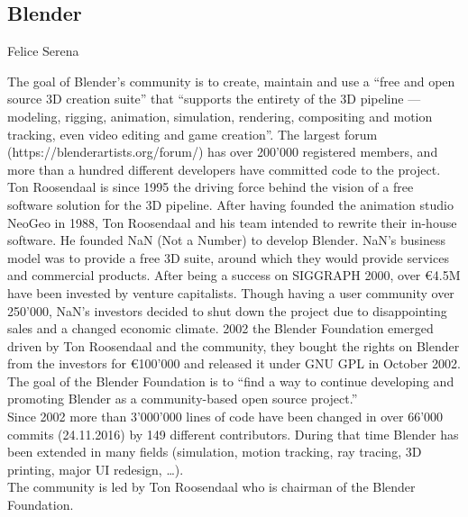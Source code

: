 \subsection{Blender}{Felice Serena}

The goal of Blender's community is to create, maintain and use a ``free and open source 3D creation suite'' that ``supports the entirety of the 3D pipeline — modeling, rigging, animation, simulation, rendering, compositing and motion tracking, even video editing and game creation''. 
The largest forum (https://blenderartists.org/forum/) has over 200'000 registered members, and more than a hundred different developers have committed code to the project. 
Ton Roosendaal is since 1995 the driving force behind the vision of a free software solution for the 3D pipeline. 
After having founded the animation studio NeoGeo in 1988\cite{blender-manual-history}, Ton Roosendaal and his team intended to rewrite their in-house software. 
He founded NaN (Not a Number) to develop Blender. 
NaN's business model was to provide a free 3D suite, around which they would provide services and commercial products. 
After being a success on SIGGRAPH 2000, over €4.5M have been invested by venture capitalists. 
Though having a user community over 250'000, NaN's investors decided to shut down the project due to disappointing sales and a changed economic climate. 
2002 the Blender Foundation emerged driven by Ton Roosendaal and the community, they bought the rights on Blender from the investors for €100'000 and released it under GNU GPL\cite{blender-license} in October 2002. 
The goal of the Blender Foundation is to ``find a way to continue developing and promoting Blender as a community-based open source project.'' \cite{blender-official-history} \\

Since 2002 more than 3'000'000 lines of code have been changed in over 66'000 commits (24.11.2016) by 149 different contributors. 
During that time Blender has been extended in many fields (simulation, motion tracking, ray tracing, 3D printing, major UI redesign, …). \\

The community is led by Ton Roosendaal who is chairman of the Blender Foundation. 

